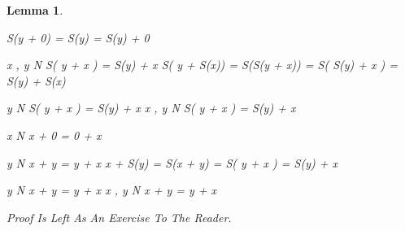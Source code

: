 \documentclass[10pt,a4paper]{book}
\newtheorem{lemma}{Lemma}[section]
\begin{document}
\begin{lemma}
    \begin{fitchproof}[arrayenv=tabular]

         {  S(y +  0) =  S(y)  = S(y) +  0 }                 

        \open
         { x , y   \in N }   
        \open
         {  S( y +   x ) = S(y) +  x }     
         {  S( y +  S(x)) = S(S(y +  x)) = S( S(y) +  x )    = S(y) +  S(x) }     
        \close

         {\forall  y \in N \quad  S( y +   x ) = S(y) +  x}      
        \close
         {\forall x , y \in N \quad  S( y +   x ) = S(y) +  x }     

    \end{fitchproof}

    \begin{fitchproof}[arrayenv=tabular]

        \open
         { x   \in N }   
         {  x  +  0  = 0 +  x }                 

        \open
         { y   \in N }   
        \open
         { x  +  y = y +  x }     
         { x  +  S(y) = S(x +  y) = S( y +  x ) = S(y) +  x }     
        \close
        \close

         {\forall y \in N \quad x  +  y = y +  x  }      
        \close
         {\forall x , y \in N \quad x  +  y = y +  x  }     

    \end{fitchproof}

    Proof Is Left As An Exercise To The Reader.

\end{lemma}
\end{document}
